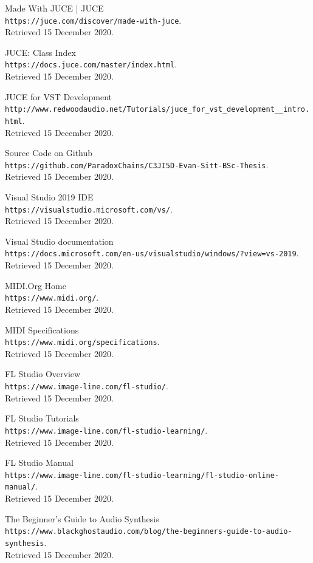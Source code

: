 \documentclass[a4paper,12pt]{report}
\begin{document}
\begin{thebibliography}{9}

Made With JUCE | JUCE
\\\texttt{https://juce.com/discover/made-with-juce}.\\
Retrieved 15 December 2020.

JUCE: Class Index
\\\texttt{https://docs.juce.com/master/index.html}.\\
Retrieved 15 December 2020.

JUCE for VST Development
\\\texttt{http://www.redwoodaudio.net/Tutorials\-/juce\_for\_vst\_development\_\_intro.html}.\\
Retrieved 15 December 2020.

Source Code on Github
\\\texttt{https://github.com\-/ParadoxChains\-/C3JI5D-Evan-Sitt-BSc-Thesis}.\\
Retrieved 15 December 2020.

Visual Studio 2019 IDE
\\\texttt{https://visualstudio.microsoft.com/vs/}.\\
Retrieved 15 December 2020.

Visual Studio documentation
\\\texttt{https://docs.microsoft.com/en-us\-/visualstudio\-/windows/?view=vs-2019}.\\
Retrieved 15 December 2020.

MIDI.Org Home
\\\texttt{https://www.midi.org/}.\\
Retrieved 15 December 2020.

MIDI Specifications
\\\texttt{https://www.midi.org/specifications}.\\
Retrieved 15 December 2020.

FL Studio Overview
\\\texttt{https://www.image-line.com/fl-studio/}.\\
Retrieved 15 December 2020.

FL Studio Tutorials
\\\texttt{https://www.image-line.com\-/fl-studio-learning/}.\\
Retrieved 15 December 2020.

FL Studio Manual
\\\texttt{https://www.image-line.com\-/fl-studio-learning\-/fl-studio-online-manual/}.\\
Retrieved 15 December 2020.

The Beginner's Guide to Audio Synthesis
\\\texttt{https://www.blackghostaudio.com/blog\-/the-beginners-guide-to-audio-synthesis}.\\
Retrieved 15 December 2020.

\end{thebibliography}
\cleardoublepage
\listoffigures
\cleardoublepage
{}
\lstlistoflistings
\end{document}

